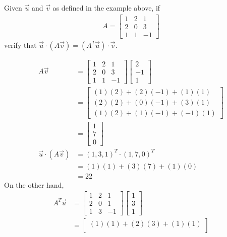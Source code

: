 \begin{exmp}
Given $\vec{u}$ and $\vec{v}$ as defined in the example above, if
\begin{align*}
A =
\begin{bmatrix}
1 & 2 & 1 \\
2 & 0 & 3 \\
1 & 1 & -1
\end{bmatrix}
\end{align*}
verify that $\vec{u} \cdot (A\vec{v}) = (A^T\vec{u}) \cdot \vec{v}$.
\end{exmp}
\begin{solution}
\begin{align*}
A\vec{v} &= 
\begin{bmatrix}
1 & 2 & 1 \\
2 & 0 & 3 \\
1 & 1 & -1
\end{bmatrix}
\begin{bmatrix}
2 \\
-1 \\
1
\end{bmatrix} \\
&=
\begin{bmatrix}
(1)(2) + (2)(-1) + (1)(1) \\
(2)(2) + (0)(-1) + (3)(1) \\
(1)(2) + (1)(-1) + (-1)(1) 
\end{bmatrix} \\
&=
\begin{bmatrix}
1 \\
7 \\
0
\end{bmatrix} \\
\vec{u} \cdot (A\vec{v}) &= (1,3,1)^T \cdot (1,7,0)^T \\
&= (1)(1) + (3)(7) + (1)(0) \\
&= 22
\end{align*}
On the other hand,
\begin{align*}
A^T\vec{u} &= 
\begin{bmatrix}
1 & 2 & 1 \\
2 & 0 & 1 \\
1 & 3 & -1
\end{bmatrix}
\begin{bmatrix}
1 \\
3 \\
1
\end{bmatrix} \\
&=
\begin{bmatrix}
(1)(1) + (2)(3) + (1)(1) \\

\end{bmatrix}
\end{align*}
\end{solution}
